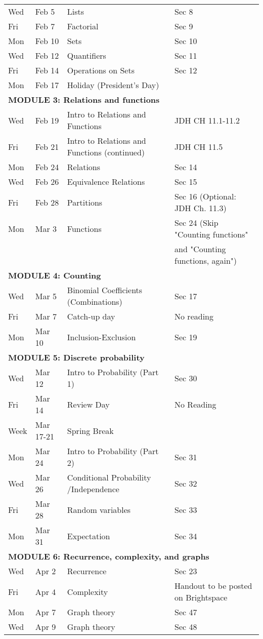 \documentclass[letterpaper]{inzane_syllabus} %
\begin{document}
\begin{center}
\begin{tabularx}{\textwidth}{p{2cm}p{2cm}p{8cm}p{9.5cm}}
Wed &  Feb 5 & Lists & Sec 8 \\
Fri &  Feb 7 & Factorial & Sec 9 \\
Mon &  Feb 10 & Sets & Sec 10 \\
Wed &  Feb 12 & Quantifiers &  Sec 11  \\
Fri &  Feb 14 & Operations on Sets & Sec 12 \\
Mon &  Feb 17 & Holiday (President's Day) & \\
\hline
\multicolumn{4}{l}{\textbf{\textcolor{myCOLOR}{\large MODULE 3: Relations and functions }}} \\
\hline
Wed &  Feb 19 & Intro to Relations and Functions & JDH CH 11.1-11.2\\
Fri &  Feb 21  & Intro to Relations and Functions (continued) & JDH CH 11.5\\
Mon &  Feb 24 & Relations & Sec 14 \\
Wed &  Feb 26 & Equivalence Relations & Sec 15 \\
Fri &  Feb 28 & Partitions & Sec 16 (Optional: JDH Ch. 11.3)\\
Mon &  Mar 3 & Functions & Sec 24 (Skip "Counting functions" \\
 & & & \quad and "Counting functions, again")\\
\hline
\multicolumn{4}{l}{\textbf{\textcolor{myCOLOR}{\large MODULE 4: Counting}}} \\
\hline
Wed &  Mar 5  & Binomial Coefficients (Combinations) & Sec 17  \\
Fri &  Mar 7  & Catch-up day & No reading \\
Mon &  Mar 10  & Inclusion-Exclusion & Sec 19 \\
\hline
\multicolumn{4}{l}{\textbf{\textcolor{myCOLOR}{\large MODULE 5: Discrete probability}}} \\
\hline
Wed &  Mar 12 & Intro to Probability (Part 1) & Sec 30 \\
Fri &  Mar 14 & Review Day & No Reading \\
Week &  Mar 17-21 & Spring Break & \\ 
Mon &  Mar 24 &  Intro to Probability  (Part 2) & Sec 31 \\
Wed &  Mar 26 & Conditional Probability /Independence &  Sec 32\\
Fri & Mar 28  &  Random variables & Sec 33 \\
Mon &  Mar 31 & Expectation & Sec 34 \\
\hline
\multicolumn{4}{l}{\textbf{\textcolor{myCOLOR}{\large MODULE 6: Recurrence, complexity, and graphs}}} \\
\hline
Wed &  Apr 2 & Recurrence  & Sec 23 \\
Fri &  Apr 4  & Complexity & Handout to be posted on Brightspace \\
Mon &  Apr 7 & Graph theory & Sec 47 \\
Wed &  Apr 9 & Graph theory & Sec 48 \\ 



\end{tabularx}
\end{center}
\end{document}
